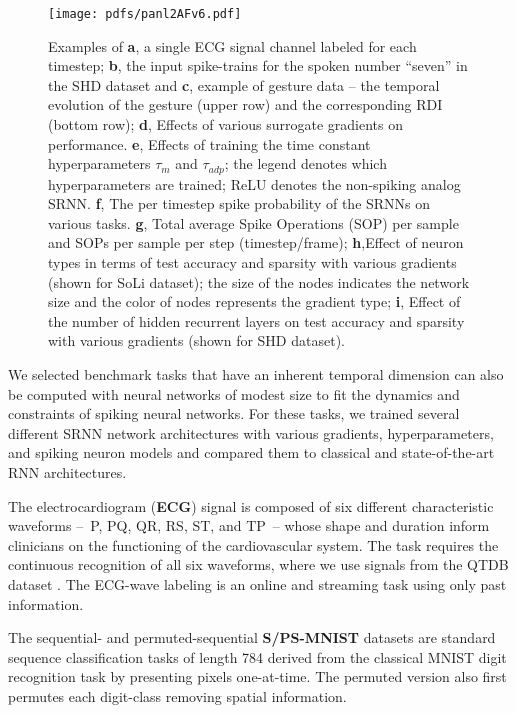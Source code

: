 \documentclass[fleqn,10pt]{wlscirep}
\begin{document}
\begin{figure}[ht!]
\centering

\texttt{[image: pdfs/panl2AFv6.pdf]}
\caption{Examples of \textbf{a}, a single ECG signal channel labeled for each timestep; \textbf{b}, the input spike-trains for the spoken number ``seven'' in the SHD dataset and \textbf{c}, example of gesture data -- the temporal evolution of the gesture (upper row) and the corresponding RDI (bottom row); \textbf{d}, Effects of various surrogate gradients on performance. \textbf{e}, Effects of training the time constant hyperparameters $\tau_m$ and $\tau_{adp}$; the legend denotes which hyperparameters are trained; ReLU denotes the non-spiking analog SRNN. \textbf{f}, The per timestep spike probability of the SRNNs on various tasks.  \textbf{g}, Total average Spike Operations (SOP) per sample and SOPs per sample per step (timestep/frame); \textbf{h},Effect of neuron types in terms of test accuracy and sparsity with various gradients (shown for SoLi dataset); the size of the nodes indicates the network size and the color of nodes represents the gradient type; \textbf{i}, Effect of the number of hidden recurrent layers on test accuracy and sparsity with various gradients (shown for SHD dataset).}
\label{fig:panel-2}
\end{figure}

We selected benchmark tasks that have an inherent temporal dimension can also be computed with neural networks of modest size to fit the dynamics and constraints of spiking neural networks. For these tasks, we trained several different SRNN network architectures with various gradients, hyperparameters, and spiking neuron models and compared them to classical and state-of-the-art RNN architectures.

The electrocardiogram ({\bf ECG}) \cite{laguna1997database} signal is composed of six different characteristic waveforms --~P, PQ, QR, RS, ST, and TP~-- whose shape and duration inform clinicians on the functioning of the cardiovascular system. The task requires the continuous recognition of all six waveforms, where we use signals from the QTDB dataset \cite{laguna1997database}. The ECG-wave labeling is an online and streaming task using only past information. 




The sequential- and permuted-sequential {\bf S/PS-MNIST} datasets are standard sequence classification tasks of length 784  derived from the classical MNIST digit recognition task by presenting pixels one-at-time. The permuted version also first permutes each digit-class removing spatial information. 
\end{document}
